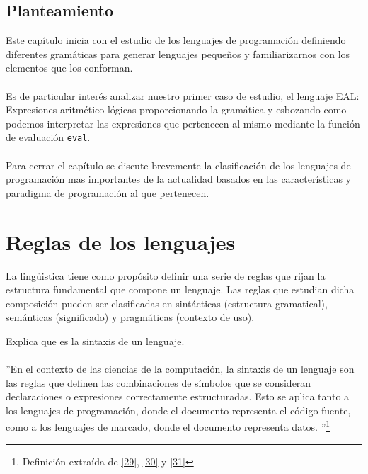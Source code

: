 \subsection*{Planteamiento}
    Este capítulo inicia con el estudio de los lenguajes de programación definiendo diferentes gramáticas para generar lenguajes pequeños y familiarizarnos con los elementos que los conforman.\\\\
    Es de particular interés analizar nuestro primer caso de estudio, el lenguaje \textsf{EAL}: Expresiones aritmético-lógicas proporcionando la gramática y esbozando como podemos interpretar las expresiones que pertenecen al mismo mediante la función de evaluación \texttt{eval}.\\\\
    Para cerrar el capítulo se discute brevemente la clasificación de los lenguajes de programación mas importantes de la actualidad basados en las características y paradigma de programación al que pertenecen. 

\section{Reglas de los lenguajes}

    La lingüistica tiene como propósito definir una serie de reglas que rijan la estructura fundamental que compone un lenguaje.
Las reglas que estudian dicha composición pueden ser clasificadas en sintácticas (estructura gramatical), semánticas (significado) y pragmáticas (contexto de uso).\\


    \begin{exercise}
        Explica que es la sintaxis  de un lenguaje.     \\\\
        ''En el contexto de las ciencias de la computación, la sintaxis de un lenguaje son las reglas que definen las combinaciones de símbolos que se consideran declaraciones o expresiones correctamente estructuradas. Esto se aplica tanto a los lenguajes de programación, donde el documento representa el código fuente, como a los lenguajes de marcado, donde el documento representa datos. ''\footnote{Definición extraída de  \hyperlink{29}{[29]}, \hyperlink{30}{[30]} y \hyperlink{31}{[31]}}
        
    \end{exercise}



